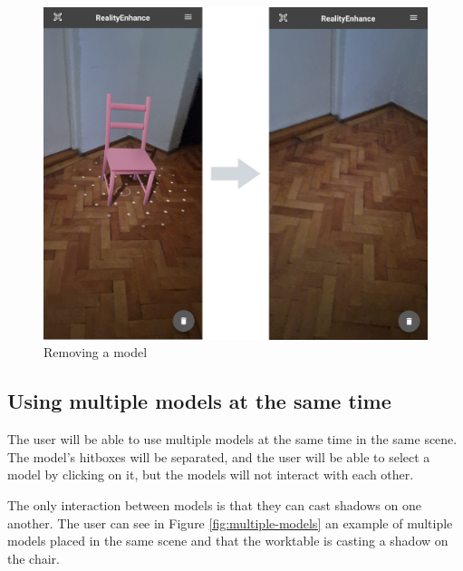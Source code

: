 \begin{figure}[ht]
    \begin{center}
        \includegraphics[width=1\textwidth]{img/App_screenshots/Model-removed.png}
        \caption{Removing a model}
        \label{fig:remove-a-model}
    \end{center}
\end{figure}

\pagebreak
\subsection{Using multiple models at the same time}
The user will be able to use multiple models at the same time in the same scene. The model's hitboxes will be separated, and the user will be able to select a model by clicking on it, but the models will not interact with each other.

The only interaction between models is that they can cast shadows on one another. The user can see in Figure \ref{fig:multiple-models} an example of multiple models placed in the same scene and that the worktable is casting a shadow on the chair.

